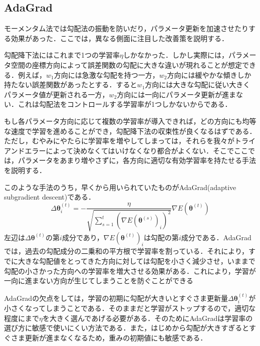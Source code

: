 \documentclass[a4paper,11pt]{jsreport}
\begin{document}
\subsection{AdaGrad}
モーメンタム法では勾配法の振動を防いだり，パラメータ更新を加速させたりする効果があった．ここでは，異なる側面に注目した改善策を説明する．\par
勾配降下法にはこれまで1つの学習率$\eta$しかなかった．しかし実際には，パラメータ空間の座標方向によって誤差関数の勾配に大きな違いが現れることが想定できる．例えば，$w_1$方向には急激な勾配を持つ一方，$w_2$方向には緩やかな傾きしか持たない誤差関数があったとする．すると$w_1$方向には大きな勾配に従い大きくパラメータ値が更新される一方，$w_2$方向には一向にパラメータ更新が進まない．これは勾配法をコントロールする学習率が1つしかないからである．\par
もし各パラメータ方向に応じて複数の学習率が導入できれば，どの方向にも均等な速度で学習を進めることができ，勾配降下法の収束性が良くなるはずである．ただし，むやみにやたらに学習率を増やしてしまっては，それらを我々がトライアンドエラーによって決めなくてはいけなくなり都合がよくない．そこでここでは，パラメータをあまり増やさずに，各方向に適切な有効学習率を持たせる手法を説明する．\par
このような手法のうち，早くから用いられていたものがAdaGrad(adaptive subgradient descent)である．
\begin{equation}
  \Delta \bm{\theta}_i^{(t)}
  = -\frac{\eta}{\sqrt{\sum_{s=1}^{t}\left(\nabla E(\bm{\theta}^{(s)})_i\right)^2}} \nabla E(\bm{\theta}^{(t)})
\end{equation}
左辺は$\Delta \bm{\theta}^{(t)}$の第$i$成分であり，$\nabla E(\bm{\theta}^{(t)})_i$は勾配の第$i$成分である．AdaGradでは，過去の勾配成分の二乗和の平方根で学習率を割っている．それにより，すでに大きな勾配値をとってきた方向に対しては勾配を小さく減少させ，いままで勾配の小さかった方向への学習率を増大させる効果がある．これにより，学習が一向に進まない方向が生じてしまうことを防ぐことができる\par
AdaGradの欠点をしては，学習の初期に勾配が大きいとすぐさま更新量$\Delta \bm{\theta}_i^{(t)}$が小さくなってしまうことである．そのままだと学習がストップするので，適切な程度にまで$\eta$を大きく選んであげる必要がある．そのためにAdaGradは学習率の選び方に敏感で使いにくい方法である．また，はじめから勾配が大きすぎるとすぐさま更新が進まなくなるため，重みの初期値にも敏感である．
\end{document}
